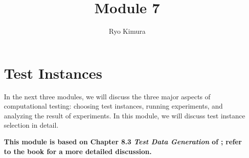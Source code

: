 \documentclass[12pt]{article}
\begin{document}
\title{Module 7}
\author{Ryo Kimura}
\date{}
\maketitle

\setcounter{section}{6}
\section{Test Instances}
In the next three modules, we will discuss the three major aspects of computational testing: choosing test instances, running experiments, and analyzing the result of experiments. In this module, we will discuss test instance selection in detail.

\textbf{This module is based on Chapter 8.3 \emph{Test Data Generation} of \cite{muller2010algeng}; refer to the book for a more detailed discussion.}
\end{document}
